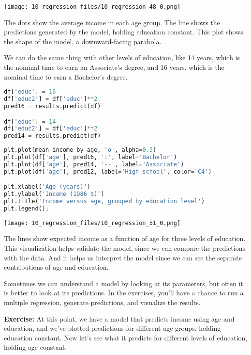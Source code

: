 \begin{center}
\texttt{[image: 10\_regression\_files/10\_regression\_48\_0.png]}
\end{center}

The dots show the average income in each age group. The line shows the
predictions generated by the model, holding education constant. This
plot shows the shape of the model, a downward-facing parabola.

We can do the same thing with other levels of education, like 14 years,
which is the nominal time to earn an Associate's degree, and 16 years,
which is the nominal time to earn a Bachelor's degree.

\begin{lstlisting}[language=Python,style=source]
df['educ'] = 16
df['educ2'] = df['educ']**2
pred16 = results.predict(df)

df['educ'] = 14
df['educ2'] = df['educ']**2
pred14 = results.predict(df)
\end{lstlisting}

\begin{lstlisting}[language=Python,style=source]
plt.plot(mean_income_by_age, 'o', alpha=0.5)
plt.plot(df['age'], pred16, ':', label='Bachelor')
plt.plot(df['age'], pred14, '--', label='Associate')
plt.plot(df['age'], pred12, label='High school', color='C4')

plt.xlabel('Age (years)')
plt.ylabel('Income (1986 $)')
plt.title('Income versus age, grouped by education level')
plt.legend();
\end{lstlisting}

\begin{center}
\texttt{[image: 10\_regression\_files/10\_regression\_51\_0.png]}
\end{center}

The lines show expected income as a function of age for three levels of
education. This visualization helps validate the model, since we can
compare the predictions with the data. And it helps us interpret the
model since we can see the separate contributions of age and education.

Sometimes we can understand a model by looking at its parameters, but
often it is better to look at its predictions. In the exercises, you'll
have a chance to run a multiple regression, generate predictions, and
visualize the results.

\textbf{Exercise:} At this point, we have a model that predicts income
using age and education, and we've plotted predictions for different age
groups, holding education constant. Now let's see what it predicts for
different levels of education, holding age constant.

